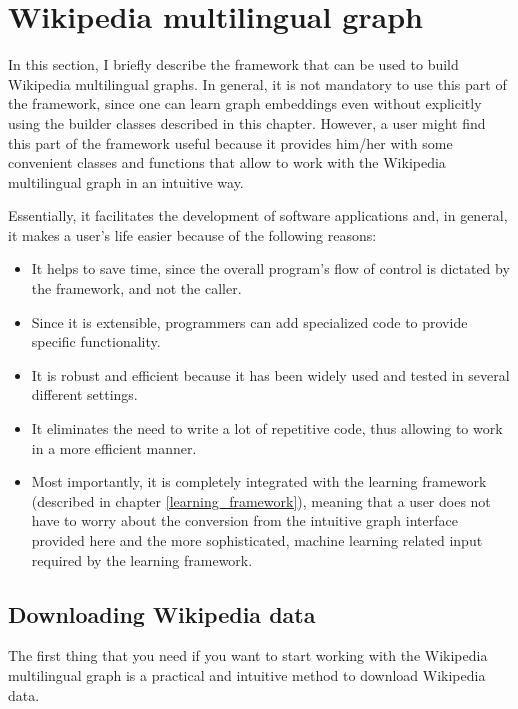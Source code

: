 \chapter{Wikipedia multilingual graph}\label{wikipedia_multilingual_graph}
    In this section, I briefly describe the framework that can be used to build Wikipedia multilingual graphs. In general, it is not mandatory to use this part of the framework, since one can learn graph embeddings even without explicitly using the builder classes described in this chapter. However, a user might find this part of the framework useful because it provides him/her with some convenient classes and functions that allow to work with the Wikipedia multilingual graph in an intuitive way.
    
    Essentially, it facilitates the development of software applications and, in general, it makes a user's life easier because of the following reasons:
    \begin{itemize}
        \item It helps to save time, since the overall program’s flow of control is dictated by the framework, and not the caller.
        \item Since it is extensible, programmers can add specialized code to provide specific functionality.
        \item It is robust and efficient because it has been widely used and tested in several different settings.
        \item It eliminates the need to write a lot of repetitive code, thus allowing to work in a more efficient manner.
        \item Most importantly, it is completely integrated with the learning framework (described in chapter \ref{learning_framework}), meaning that a user does not have to worry about the conversion from the intuitive graph interface provided here and the more sophisticated, machine learning related input required by the learning framework.
    \end{itemize}
    \section{Downloading Wikipedia data}
        The first thing that you need if you want to start working with the Wikipedia multilingual graph is a practical and intuitive method to download Wikipedia data.
